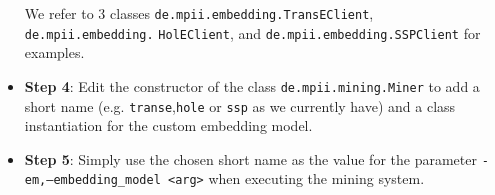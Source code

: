 \begin{itemize}
\begin{itemize}
\end{itemize}
We refer to 3 classes \texttt{de.mpii.embedding.TransEClient}, \texttt{de.mpii.embedding.} \texttt{HolEClient}, and  \texttt{de.mpii.embedding.SSPClient} for examples.
\item \textbf{Step 4}: Edit the constructor of the class \texttt{de.mpii.mining.Miner} to add a short name (e.g. \texttt{transe},\texttt{hole} or \texttt{ssp} as we currently have) and a class instantiation for the custom embedding model.
\item \textbf{Step 5}: Simply use the chosen short name as the value for the parameter \texttt{-em,--embedding\_model <arg>} when executing the mining system.
\end{itemize}